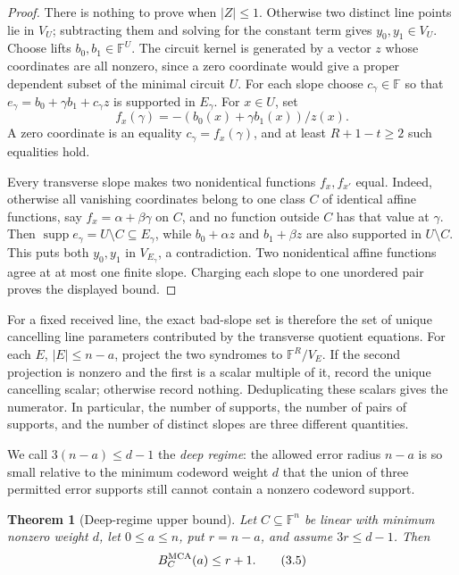 \documentclass[12pt,a4paper]{amsart}
\numberwithin{equation}{section}
\newtheorem{theorem}{Theorem}[section]
\theoremstyle{remark}
\DeclareMathOperator{\supp}{supp}
\newcommand{\F}{\mathbb F}
\newcommand{\abs}[1]{\lvert #1\rvert}
\begin{document}
\begin{proof}
There is nothing to prove when \(\abs Z\le1\).  Otherwise two distinct
line points lie in \(V_U\); subtracting them and solving for the constant
term gives \(y_0,y_1\in V_U\).  Choose lifts
\(b_0,b_1\in\F^U\).  The circuit kernel is generated by a vector
\(z\) whose coordinates are all nonzero, since a zero coordinate would
give a proper dependent subset of the minimal circuit \(U\).  For each slope choose
\(c_\gamma\in\F\) so that
\(e_\gamma=b_0+\gamma b_1+c_\gamma z\) is supported in
\(E_\gamma\).  For \(x\in U\), set
\[
             f_x(\gamma)=-(b_0(x)+\gamma b_1(x))/z(x).
\]
A zero coordinate is an equality \(c_\gamma=f_x(\gamma)\), and at least
\(R+1-t\ge2\) such equalities hold.

Every transverse slope makes two nonidentical functions \(f_x,f_{x'}\)
equal.  Indeed, otherwise all vanishing coordinates belong to one class
\(C\) of identical affine functions, say
\(f_x=\alpha+\beta\gamma\) on \(C\), and no function outside \(C\) has
that value at \(\gamma\).  Then
\(\supp e_\gamma=U\setminus C\subseteq E_\gamma\), while
\(b_0+\alpha z\) and \(b_1+\beta z\) are also supported in
\(U\setminus C\).  This puts both \(y_0,y_1\) in \(V_{E_\gamma}\), a
contradiction.  Two nonidentical affine functions agree at at most one
finite slope.  Charging each slope to one unordered pair proves the
displayed bound.
\end{proof}

For a fixed received line, the exact bad-slope set is therefore the set of
unique cancelling line parameters contributed by the transverse quotient
equations.  For each \(E\), \(\abs E\le n-a\), project the two
syndromes to \(\F^R/V_E\).  If the second projection is nonzero and the
first is a scalar multiple of it, record the unique cancelling scalar;
otherwise record nothing.  Deduplicating these scalars gives the numerator.
In particular, the number of supports, the number of pairs of supports, and
the number of distinct slopes are three different quantities.

We call \(3(n-a)\le d-1\) the \emph{deep regime}: the allowed error
radius \(n-a\) is so small relative to the minimum codeword weight \(d\)
that the union of three permitted error supports still cannot contain a
nonzero codeword support.

\begin{theorem}[Deep-regime upper bound]\label{thm:deep-regime-upper}
Let \(C\subseteq\F^n\) be linear with minimum nonzero weight \(d\), let
\(0\le a\le n\), put \(r=n-a\), and assume \(3r\le d-1\).  Then
\[
 B_C^{\rm MCA}(a)\le r+1.
 \tag{3.5}\label{eq:deep-upper}
\]
\end{theorem}
\end{document}
